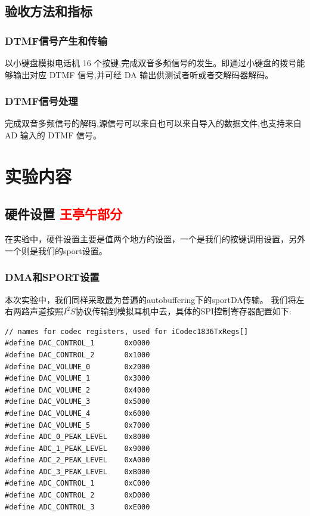 \documentclass{article}
\begin{document}
\begin{CJK}{UTF8}{gbsn}
\subsection{验收方法和指标}
\subsubsection{DTMF信号产生和传输}
以小键盘模拟电话机 16 个按键,完成双音多频信号的发生。即通过小键盘的拨号能够输出对应 DTMF 信号,并可经 DA 输出供测试者听或者交解码器解码。
\subsubsection{DTMF信号处理}
完成双音多频信号的解码,源信号可以来自也可以来自导入的数据文件,也支持来自AD 输入的 DTMF 信号。
\section{实验内容}
\subsection{硬件设置 \textcolor{red}{王亭午部分}}
在实验中，硬件设置主要是值两个地方的设置，一个是我们的按键调用设置，另外一个则是我们的sport设置。
\subsubsection{DMA和SPORT设置}
本次实验中，我们同样采取最为普遍的autobuffering下的sportDA传输。
我们将左右两路声道按照\(I^2S\)协议传输到模拟耳机中去，具体的SPI控制寄存器配置如下:
\begin{lstlisting}
// names for codec registers, used for iCodec1836TxRegs[]
#define DAC_CONTROL_1		0x0000
#define DAC_CONTROL_2		0x1000
#define DAC_VOLUME_0		0x2000
#define DAC_VOLUME_1		0x3000
#define DAC_VOLUME_2		0x4000
#define DAC_VOLUME_3		0x5000
#define DAC_VOLUME_4		0x6000
#define DAC_VOLUME_5		0x7000
#define ADC_0_PEAK_LEVEL	0x8000
#define ADC_1_PEAK_LEVEL	0x9000
#define ADC_2_PEAK_LEVEL	0xA000
#define ADC_3_PEAK_LEVEL	0xB000
#define ADC_CONTROL_1		0xC000
#define ADC_CONTROL_2		0xD000
#define ADC_CONTROL_3		0xE000


\end{lstlisting}
\end{CJK}
\end{document}
